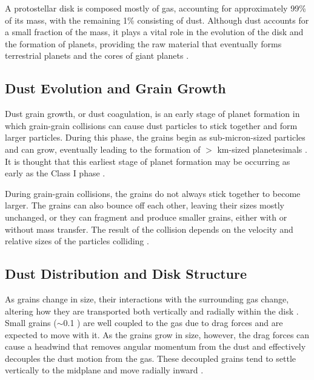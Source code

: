 

A protostellar disk is composed mostly of gas, accounting for approximately 99\% of its mass, with the remaining 1\% consisting of dust. Although dust accounts for a small fraction of the mass, it plays a vital role in the evolution of the disk and the formation of planets, providing the raw material that eventually forms terrestrial planets and the cores of giant planets \citep{Williams, Birnstiel2016}.

\subsection{Dust Evolution and Grain Growth}






Dust grain growth, or dust coagulation, is an early stage of planet formation in which grain-grain collisions can cause dust particles to stick together and form larger particles. During this phase, the grains begin as sub-micron-sized particles and can grow, eventually leading to the formation of $>$ km-sized planetesimals \citep{Birnstiel2016}. It is thought that this earliest stage of planet formation may be occurring as early as the Class I phase \citep{Dom2020}. 

During grain-grain collisions, the grains do not always stick together to become larger. The grains can also bounce off each other, leaving their sizes mostly unchanged, or they can fragment and produce smaller grains, either with or without mass transfer. The result of the collision depends on the velocity and relative sizes of the particles colliding \citep{Testi}.



\subsection{Dust Distribution and Disk Structure}

As grains change in size, their interactions with the surrounding gas change, altering how they are transported both vertically and radially within the disk \citep{Andrews}. Small grains ($\sim$0.1 \micronNS) are well coupled to the gas due to drag forces and are expected to move with it.  As the grains grow in size, however, the drag forces can cause a headwind that removes angular momentum from the dust and effectively decouples the dust motion from the gas.  These decoupled grains tend to settle vertically to the midplane and move radially inward \citep{Dullemond2004, Barri2005, Birnstiel2016}.


